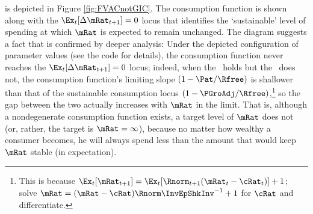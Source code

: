 \documentclass[./BufferStockTheory.tex]{subfiles}
\begin{document}
\cncl{\GIC} is depicted in Figure \ref{fig:FVACnotGIC}.  The
consumption function is shown along with the $\Ex_{t}[\Delta
\mRat_{t+1}]=0$ locus that identifies the `sustainable' level of
spending at which $\mRat$ is expected to remain unchanged.  The
diagram suggests a fact that is confirmed by deeper analysis: Under
the depicted configuration of parameter values (see the code for details), the consumption function never reaches the
$\Ex_{t}[\Delta \mRat_{t+1}]=0$ locus; indeed, when the \RIC~holds but
the \GIC~does not, the consumption function's limiting slope
$(1-\Pat/\Rfree)$ is shallower than that of the sustainable consumption
locus $(1-\PGroAdj/\Rfree)$,\footnote{This is because
    $\Ex_{t}[\mRat_{t+1}]=\Ex_{t}[\Rnorm_{t+1}(\mRat_{t}-\cRat_{t})]+1$; solve $\mRat = (\mRat - \cRat)\Rnorm \InvEpShkInv^{-1}+1$ for $\cRat$ and differentiate.}
  so the gap between the two actually increases with $\mRat$ in the
  limit.  That is, although a nondegenerate consumption function
  exists, a target level of $\mRat$ does not (or, rather, the
  target is $\mRat=\infty$), because no matter how wealthy a consumer
  becomes, he will always spend less than the amount that
  would keep $\mRat$ stable (in expectation).

\renewcommand{\figFile}{FVACnotGIC}
\hypertarget{\figFile}{}


\begin{comment}
The foregoing has some connection with the theoretical results in
Szeidl~\citeyearpar{szeidlInvariant}, who shows that the condition we
call the \GIC~guarantees that $\mRat$ will have an asymptotically
bounded mean.  He also shows that under these circumstances $\mRat$
satisfies conditions he proves to be necessary for the existence of a
stable invariant distribution.  Furthermore, $\aRat$, $\bRat$, and $\cRat$
are also shown to have stable invariant distributions and asymptotically
bounded means.  We make use of these results below.
\end{comment}

\begin{comment} %
A final point worth reemphasizing is that neither the Return
Impatience Condition nor the Finite Human Wealth Condition was
required for the contraction mapping proof.  Both these conditions are
necessary for a nondegenerate solution to exist in the unconstrained
perfect foresight case.  This is noteworthy because in some models and
in many economists' intuition, the introduction of uncertainty reduces
the space of parameter values for which a unique solution exists;
here, precisely the opposite occurs.  Indeed, many of the
parameterizations newly eligible for solution are quite plausible, so
this observation is not merely a curiosum but of real practical
value.\footnote{An easy example of a case where the perfect foresight
  model has no solution is where $\Rfree >1$, $\DiscFac = 1/\Rfree$
  and $\PGro > \Rfree$.}
\end{comment}
\end{document}
